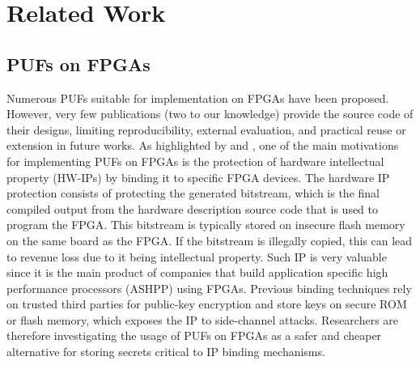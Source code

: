 
\chapter{Related Work}
\label{chapter:related_work}
\section{PUFs on FPGAs}
Numerous PUFs suitable for implementation on FPGAs have been proposed. However, very few publications (two to our knowledge) provide the source code of their designs, limiting reproducibility, external evaluation, and practical reuse or extension in future works. As highlighted by \cite{6546024} and \cite{6645555}, one of the main motivations for implementing PUFs on FPGAs is the protection of hardware intellectual property (HW-IPs) by binding it to specific FPGA devices. The hardware IP protection consists of protecting the generated bitstream, which is the final compiled output from the hardware description source code that is used to program the FPGA. This bitstream is typically stored on insecure flash memory on the same board as the FPGA. If the bitstream is illegally copied, this can lead to revenue loss due to it being intellectual property. Such IP is very valuable since it is the main product of companies that build application specific high performance processors (ASHPP) using FPGAs. Previous binding techniques rely on trusted third parties for public-key encryption \cite{4439246} and store keys on secure ROM or flash memory, which exposes the IP to side-channel attacks. Researchers are therefore investigating the usage of PUFs on FPGAs as a safer and cheaper alternative for storing secrets critical to IP binding mechanisms.


